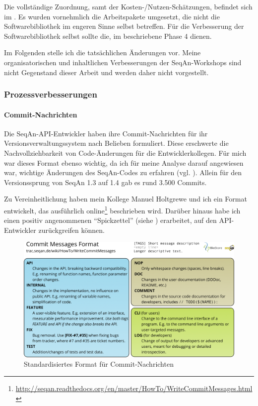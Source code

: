 Die vollständige Zuordnung, samt der Kosten-/Nutzen-Schätzungen, befindet sich im . Es wurden vornehmlich die Arbeitspakete umgesetzt, die nicht die Softwarebibliothek im engeren Sinne selbst betreffen. Für die Verbesserung der Softwarebibliothek selbst sollte die, im  beschriebene Phase 4 dienen.

\bigskip

Im Folgenden stelle ich die tatsächlichen Änderungen vor. Meine organisatorischen und inhaltlichen Verbesserungen der SeqAn-Workshops sind nicht Gegenstand dieser Arbeit und werden daher nicht vorgestellt. 


\subsubsection{Prozessverbesserungen}

\paragraph{Commit-Nachrichten}

Die SeqAn-API-Entwickler haben ihre Commit-Nachrichten für ihr Versionsverwaltungssystem nach Belieben formuliert. Diese erschwerte die Nachvollziehbarkeit von Code-Änderungen für die Entwicklerkollegen. Für mich war dieses Format ebenso wichtig, da ich für meine Analyse darauf angewiesen war, wichtige Änderungen des SeqAn-Codes zu erfahren (vgl. ). Allein für den Versionssprung von SeqAn 1.3 auf 1.4 gab es rund 3.500 Commits.

Zu Vereinheitlichung haben mein Kollege Manuel Holtgrewe und ich ein Format entwickelt, das ausführlich online\footnote{\url{http://seqan.readthedocs.org/en/master/HowTo/WriteCommitMessages.html}} beschrieben wird. Darüber hinaus habe ich einen positiv angenommenen ``Spickzettel'' (siehe ) erarbeitet, auf den API-Entwickler zurückgreifen können.

\begin{figure}
  \centering
    \includegraphics[width=0.9\linewidth]{Figures/20120504-CommitMessagesFormat.png}
  \caption[Commit-Nachrichten-Format]{Standardisiertes Format für Commit-Nachrichten}
  \label{fig:commit-messages-format}
\end{figure}


